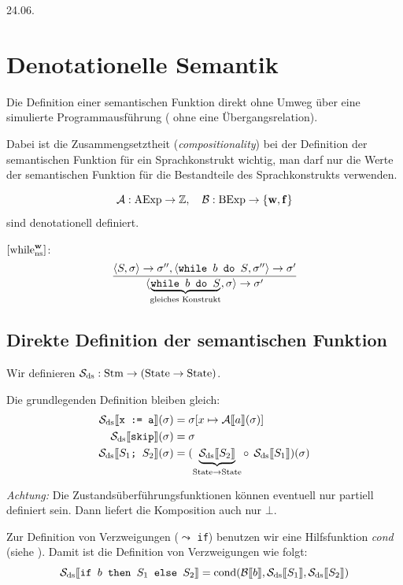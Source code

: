 \newpage
\hfill 24.06.

\section{Denotationelle Semantik}


\begin{remark}[Ziel]
    Die Definition einer semantischen Funktion direkt ohne Umweg über eine simulierte Programmausführung (\dh{} ohne eine Übergangsrelation).

    Dabei ist die Zusammengsetztheit (\emph{compositionality}) bei der Definition der semantischen Funktion für ein Sprachkonstrukt wichtig, \dh{} man darf nur die Werte der semantischen Funktion für die Bestandteile des Sprachkonstrukts verwenden.
\end{remark}

\begin{example}
    \[ \A: \AExp \to \mathbb{Z}, \quad \B: \BExp \to \bool \]
    sind denotationell definiert.
\end{example}

\begin{example}[Gegenbeispiel]
    $\infruleNs[\true]{while}$: \[
        \frac{
            \strans{S}{\sigma}{\sigma''}, \strans{\texttt{while $b$ do $S$}}{\sigma''}{\sigma'}
        }{
            \strans{\underbrace{\texttt{while $b$ do $S$}}_{\text{gleiches Konstrukt}}}{\sigma}{\sigma'}
        }
    \]
\end{example}



\subsection{Direkte Definition der semantischen Funktion}

\begin{definition}
    Wir definieren $\mathcal{S}_{\text{ds}} : \Stm \to (\State \to \State)$.

    Die grundlegenden Definition bleiben gleich:
    \begin{align*}
        \Sdssem{\texttt{x := a}}(\sigma) & = \sigma[x \mapsto \Asem{a}(\sigma)] \\
        \Sdssem{\texttt{skip}}(\sigma) & = \sigma \\
        \Sdssem{\texttt{$S_1$; $S_2$}}(\sigma) & = (\underbrace{\Sdssem{S_2}}_{\State \to \State} \circ\;\, \Sdssem{S_1})(\sigma)
    \end{align*}

    \emph{Achtung:} Die Zustandsüberführungsfunktionen können eventuell nur partiell definiert sein. Dann liefert die Komposition auch nur $\bot$.

    Zur Definition von Verzweigungen ($\leadsto$ \texttt{if}) benutzen wir eine Hilfsfunktion \emph{cond} (siehe ). Damit ist die Definition von Verzweigungen wie folgt:
    \[
        \Sdssem{\texttt{if $b$ then $S_1$ else $S_2$}} = \cond(\Bsem{b}, \Sdssem{S_1}, \Sdssem{S_2})
    \]
\end{definition}

